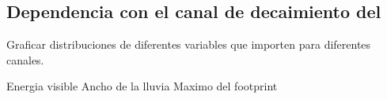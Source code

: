 	\subsection{Dependencia con el canal de decaimiento del \tauon{}}
	
	Graficar distribuciones de diferentes variables que importen para diferentes canales.
	
	Energia visible
	Ancho de la lluvia
	Maximo del footprint
	
	
	

